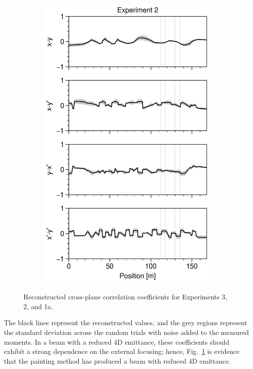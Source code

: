 \begin{figure}[!p]
\begin{subfigure}{0.32\textwidth}
        \includegraphics[width=\textwidth]{Images/chapter5/exp1a/compare_corr.png}
    \end{subfigure}
    \caption{Reconstructed cross-plane correlation coefficients for Experiments 3, 2, and 1a.}
    \label{fig:exp3_compare_corr}
    \vspace*{3.0cm}
\end{figure}
% 
The black lines represent the reconstructed values, and the grey regions represent the standard deviation across the random trials with noise added to the measured moments. In a beam with a reduced 4D emittance, these coefficients should exhibit a strong dependence on the external focusing; hence, Fig.~\ref{fig:exp3_compare_corr} is evidence that the painting method has produced a beam with reduced 4D emittance.

